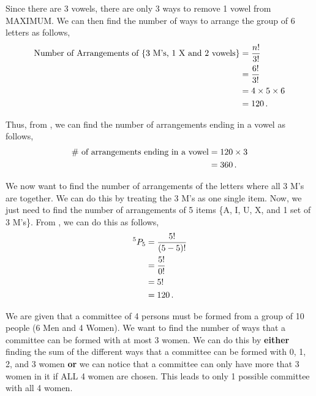\begin{subquestions}
\begin{subsubquestions}
Since there are 3 vowels, there are only 3 ways to remove 1 vowel from MAXIMUM. We can then find the number of ways to arrange the group of 6 letters as follows,
\begin{align}
	\text{Number of Arrangements of \{3 M's, 1 X and 2 vowels\}} & = \frac{n!}{3!} \nonumber \\
																 & = \frac{6!}{3!} \nonumber \\
																 & = 4 \times 5 \times 6 \nonumber \\
																 & = 120 \,.
\end{align}
 
Thus, from , we can find the number of arrangements ending in a vowel as follows,
\begin{align}
	\text{$\#$ of arrangements ending in a vowel} & = 120 \times 3 \nonumber \\
	                                            & = 360 \,.
\end{align}


\subsubquestion

We now want to find the number of arrangements of the letters where all 3 M's are together. We can do this by treating the 3 M's as one single item. Now, we just need to find the number of arrangements of 5 items \{A, I, U, X, and 1 set of 3 M's\}. From , we can do this as follows,
\begin{align}
	^{5}P_5 & = \frac{5!}{(5-5)!} \nonumber \\
	        & = \frac{5!}{0!} \nonumber \\
	        & = 5! \nonumber \\
	        & = 120 \,.
\end{align}

\end{subsubquestions}


\subquestion

We are given that a committee of 4 persons must be formed from a group of 10 people (6 Men and 4 Women). We want to find the number of ways that a committee can be formed with at most 3 women. We can do this by \textbf{either} finding the sum of the different ways that a committee can be formed with 0, 1, 2, and 3 women \textbf{or} we can notice that a committee can only have more that 3 women in it if ALL 4 women are chosen. This leads to only 1 possible committee with all 4 women. 


\end{subquestions}
